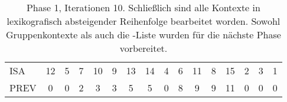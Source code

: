 \begin{table}[H]
\begin{adjustbox}{max width=\textwidth}
\begin{tabular}{lccccccccccccccc}
\multicolumn{1}{l|}{ISA}     & 12                        & 5  & 7                       & 10                         & 9                           & 13                        & 14                         & 4                       & 6                        & 11 & 8                       & 15 & 2  & 3  & 1                         \\
\multicolumn{1}{l|}{PREV}    & 0                         & 0  & 2                       & 3                          & 3                           & 5                         & 5                          & 0                       & 8                        & 9  & 9                       & 11 & 0  & 0  & \cellcolor[HTML]{\red}0
\end{tabular}
\end{adjustbox}

\caption[Phase 1, Iterationen 10]{Phase 1, Iterationen 10. Schließlich sind alle Kontexte in lexikografisch absteigender Reihenfolge bearbeitet worden. Sowohl Gruppenkontexte als auch die \prevpointer-Liste wurden für die nächste Phase vorbereitet.}
\label{table_complex_example_1_10} 
\end{table}
